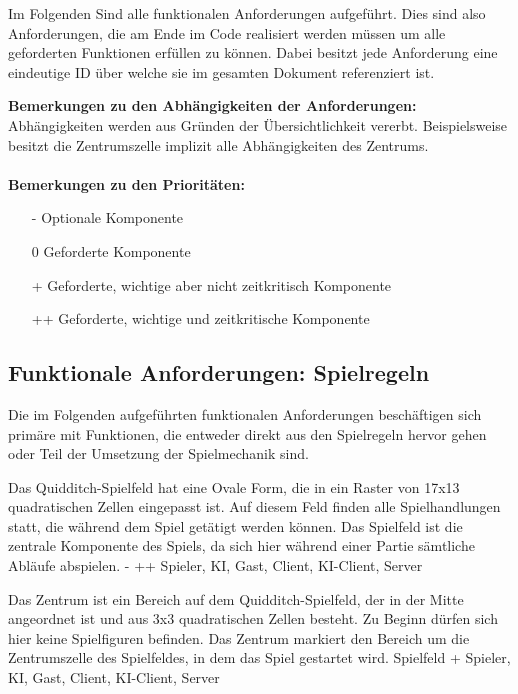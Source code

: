 Im Folgenden Sind alle funktionalen Anforderungen aufgeführt. Dies sind also Anforderungen, die am Ende im Code realisiert werden müssen um alle geforderten Funktionen erfüllen zu können. Dabei besitzt jede Anforderung eine eindeutige ID über welche sie im gesamten Dokument referenziert ist.

\textbf{Bemerkungen zu den Abhängigkeiten der Anforderungen:} \\
Abhängigkeiten werden aus Gründen der Übersichtlichkeit vererbt. Beispielsweise besitzt die Zentrumszelle implizit alle Abhängigkeiten des Zentrums.  \\ \\
 \textbf{Bemerkungen zu den Prioritäten:} \\
 \begin{itemize}
    \item[-] Optionale Komponente
    \item[0] Geforderte Komponente
    \item[+] Geforderte, wichtige aber nicht zeitkritisch Komponente
    \item[++] Geforderte, wichtige und zeitkritische Komponente
 \end{itemize}

\subsection{Funktionale Anforderungen: Spielregeln} 

Die im Folgenden aufgeführten funktionalen Anforderungen beschäftigen sich primäre mit Funktionen, die entweder direkt aus den Spielregeln hervor gehen oder Teil der Umsetzung der Spielmechanik sind.

        {Das Quidditch-Spielfeld hat eine Ovale Form, die in ein Raster von 17x13 quadratischen Zellen eingepasst ist. Auf diesem Feld finden alle Spielhandlungen statt, die während dem Spiel getätigt werden können.}
        {Das Spielfeld ist die zentrale Komponente des Spiels, da sich hier während einer Partie sämtliche Abläufe abspielen.}
        {-}
        {++}
        {Spieler, KI, Gast, Client, KI-Client, Server}

        {Das Zentrum ist ein Bereich auf dem Quidditch-Spielfeld, der in der Mitte angeordnet ist und aus 3x3 quadratischen Zellen besteht. Zu Beginn dürfen sich hier keine Spielfiguren befinden.}
        {Das Zentrum markiert den Bereich um die Zentrumszelle des Spielfeldes, in dem das Spiel gestartet wird.}
        {Spielfeld}
        {+}
        {Spieler, KI, Gast, Client, KI-Client, Server}

